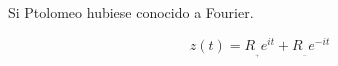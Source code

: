 \documentclass[preview]{standalone}
\begin{document}
\begin{center}
Si Ptolomeo  hubiese conocido a Fourier.

$$z(t)=  R_{_{_+}} e^{it} +R_{_{_-}} e^{-it}$$
\end{center}
\end{document}
